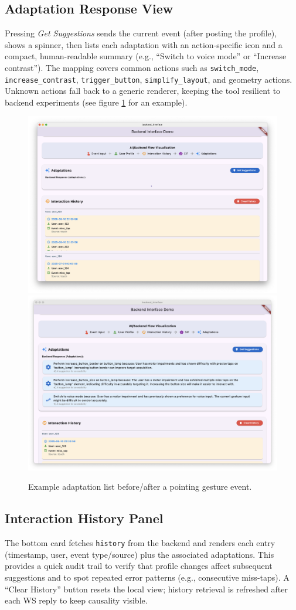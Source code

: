 \subsection{Adaptation Response View}
Pressing \emph{Get Suggestions} sends the current event (after posting the profile), shows a spinner, then lists each adaptation with an action-specific icon and a compact, human-readable summary (e.g., “Switch to voice mode” or “Increase contrast”). The mapping covers common actions such as \texttt{switch\_mode}, \texttt{increase\_contrast}, \texttt{trigger\_button}, \texttt{simplify\_layout}, and geometry actions. Unknown actions fall back to a generic renderer, keeping the tool resilient to backend experiments (see figure \ref{fig:backend-inject-adapt} for an example). 

\begin{figure}[h]
\centering
\includegraphics[width=.5\linewidth]{images/fig_backend_inject_adapt_before.png}\hfill
\includegraphics[width=.5\linewidth]{images/fig_backend_inject_adapt_after.png}
\caption{Example adaptation list before/after a pointing gesture event.}
\label{fig:backend-inject-adapt}
\end{figure}

\subsection{Interaction History Panel}
The bottom card fetches \texttt{history} from the backend and renders each entry (timestamp, user, event type/source) plus the associated adaptations. This provides a quick audit trail to verify that profile changes affect subsequent suggestions and to spot repeated error patterns (e.g., consecutive miss-taps). A “Clear History” button resets the local view; history retrieval is refreshed after each WS reply to keep causality visible.

